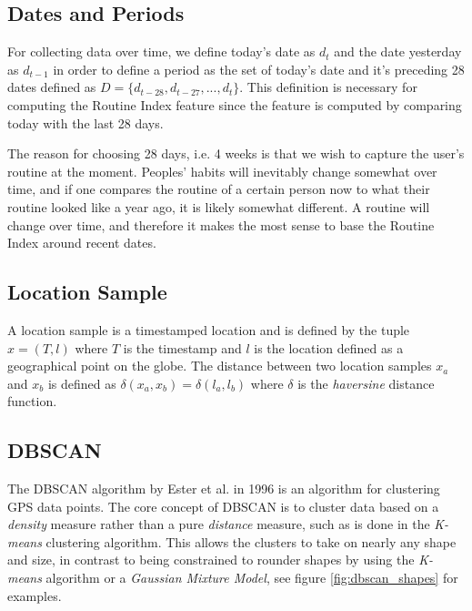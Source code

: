 \subsection{Dates and Periods}
For collecting data over time, we define today's date as $d_t$ and the date yesterday as $d_{t-1}$ in order to define a period as the set of today's date and it's preceding 28 dates defined as $D = \{d_{t-28}, d_{t-27}, ..., d_{t}\}$. This definition is necessary for computing the Routine Index feature since the feature is computed by comparing today with the last 28 days. 

The reason for choosing 28 days, i.e. 4 weeks is that we wish to capture the user's routine at the moment. Peoples' habits will inevitably change somewhat over time, and if one compares the routine of a certain person now to what their routine looked like a year ago, it is likely somewhat different. A routine will change over time, and therefore it makes the most sense to base the Routine Index around recent dates.

\subsection{Location Sample}
A location sample is a timestamped location and is defined by the tuple $x = (T, l)$ where $T$ is the  timestamp and $l$ is the location defined as a geographical point on the globe. The distance between two location samples $x_a$ and $x_b$ is defined as $\delta(x_a, x_b) = \delta(l_a, l_b)$ where $\delta$ is the \textit{haversine} distance function.


\subsection{DBSCAN}
The DBSCAN algorithm by Ester et al. in 1996 \cite{density-based-1996} is an algorithm for clustering GPS data points. The core concept of DBSCAN is to cluster data based on a \textit{density} measure rather than a pure \textit{distance} measure, such as is done in the \textit{K-means} clustering algorithm. This allows the clusters to take on nearly any shape and size, in contrast to being constrained to rounder shapes by using the \textit{K-means} algorithm or a \textit{Gaussian Mixture Model}, see figure \ref{fig:dbscan_shapes} for examples.\\


